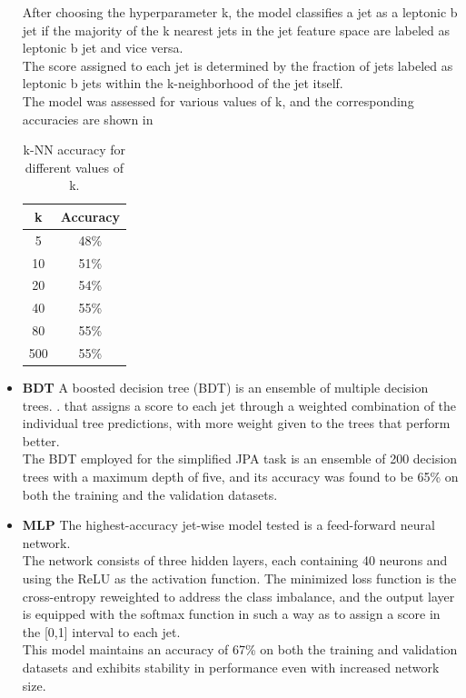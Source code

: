 \begin{itemize}
    \begin{minipage}{\linewidth}
    \begin{minipage}{0.65\linewidth}
        After choosing the hyperparameter k, the model classifies a jet as a leptonic b jet if the majority of the k nearest jets in the jet feature space are labeled as leptonic b jet and vice versa.\\
        The score assigned to each jet is determined by the fraction of jets labeled as leptonic b jets within the k-neighborhood of the jet itself.\\
        The model was assessed for various values of k, and the corresponding accuracies are shown in 
    \end{minipage}
    \hfill
        \begin{minipage}{0.3\linewidth}
        \begin{table}[H]
            \centering
             \fontsize{11.pt}{11.pt}\selectfont
            \begin{tabular}{c|c}
            \toprule
                \textbf{k} & \textbf{Accuracy} \\
                \midrule
                5 & 48\%\\
                10 & 51\%\\
                20 & 54\%\\
                40 & 55\%\\
                80 & 55\%\\
                500 & 55\%\\
            \end{tabular}
            \caption{k-NN accuracy for different values of k.}
            \label{tab:knn}
        \end{table}
        \end{minipage}
        \end{minipage}
    \item \textbf{BDT} A boosted decision tree (BDT) is an ensemble of multiple decision trees. \ADDREF. 
    that assigns a score to each jet through a weighted combination of the individual tree predictions, with more weight given to the trees that perform better.\\
    The BDT employed for the simplified JPA task is an ensemble of 200 decision trees with a maximum depth of five, and its accuracy was found to be 65\% on both the training and the validation datasets.
    \item \textbf{MLP} The highest-accuracy jet-wise model tested is a feed-forward neural network.\\
    The network consists of three hidden layers, each containing 40 neurons and using the ReLU as the activation function. The minimized loss function is the cross-entropy reweighted to address the class imbalance, and the output layer is equipped with the softmax function in such a way as to assign a score in the [0,1] interval to each jet.\\
    This model maintains an accuracy of 67\% on both the training and validation datasets and exhibits stability in performance even with increased network size.
\end{itemize}



